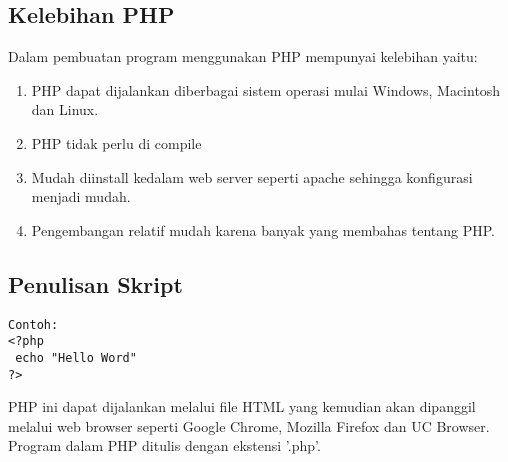 \subsection{Kelebihan PHP}
Dalam pembuatan program menggunakan PHP mempunyai kelebihan yaitu:
\begin{enumerate}
\item PHP dapat dijalankan diberbagai sistem operasi mulai Windows, Macintosh dan Linux.
\item PHP tidak perlu di compile
\item Mudah diinstall kedalam web server seperti apache sehingga konfigurasi menjadi mudah.
\item Pengembangan relatif mudah karena banyak yang membahas tentang PHP.
\end{enumerate}

\subsection{Penulisan Skript}
\begin{lstlisting}
Contoh:
<?php
 echo "Hello Word"
?>
\end{lstlisting}
PHP ini dapat dijalankan melalui file HTML yang kemudian akan dipanggil melalui web browser seperti Google Chrome, Mozilla Firefox dan UC Browser.
Program dalam PHP ditulis dengan ekstensi '.php'.

